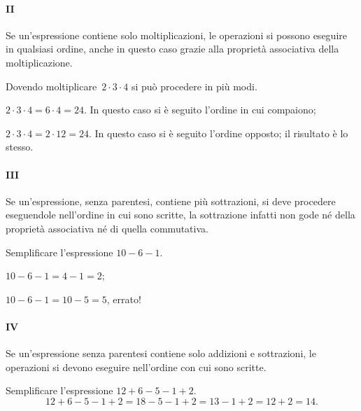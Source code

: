 \paragraph {II} Se un'espressione contiene solo moltiplicazioni, le operazioni si possono eseguire in qualsiasi
ordine, anche in questo caso grazie alla proprietà associativa della moltiplicazione.
\begin{exrig}
 \begin{esempio}
 Dovendo moltiplicare~$2\cdot 3\cdot 4$ si può procedere in più modi.
\begin{itemize*}
 \item $2\cdot 3\cdot 4=6\cdot 4=24$. In questo caso si è seguito l'ordine in cui compaiono;
 \item $2\cdot 3\cdot 4=2\cdot 12=24$. In questo caso si è seguito l'ordine opposto; il risultato è lo stesso.
\end{itemize*}
 \end{esempio}
\end{exrig}

\paragraph {III} Se un'espressione, senza parentesi, contiene più sottrazioni, si deve procedere eseguendole
nell'ordine in cui sono scritte, la sottrazione infatti non gode né della proprietà associativa né di quella
commutativa.
\begin{exrig}
 \begin{esempio}
 Semplificare l'espressione $10-6-1$.
\begin{itemize*}
 \item $10-6-1=4-1=2$;
 \item $10-6-1=10-5=5$, errato!
\end{itemize*}
 \end{esempio}
\end{exrig}

\paragraph {IV} Se un'espressione senza parentesi contiene solo addizioni e sottrazioni, le operazioni si devono
eseguire nell'ordine con cui sono scritte.
\begin{exrig}
 \begin{esempio}
 Semplificare l'espressione $12+6-5-1+2$.
 \[12+6-5-1+2=18-5-1+2=13-1+2=12+2=14.\]
 \end{esempio}
\end{exrig}

